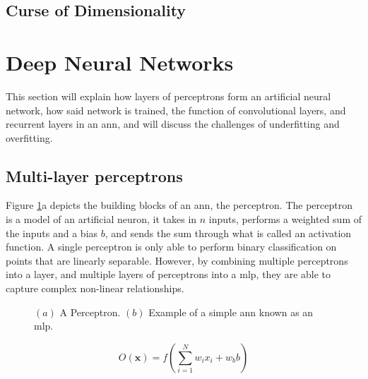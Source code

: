 \subsection{Curse of Dimensionality}

\clearpage

\section{Deep Neural Networks} \label{sec:ann}

This section will explain how layers of perceptrons form an artificial neural network, how said network is trained, the function of convolutional layers, and recurrent layers in an \acrshort{ann}, and will discuss the challenges of underfitting and overfitting.

\subsection{Multi-layer perceptrons} \label{sec:mlp}
Figure \ref{fig:perc_nn}a depicts the building blocks of an \acrshort{ann}, the perceptron. 
The perceptron is a model of an artificial neuron, it takes in $n$ inputs, performs a weighted sum of the inputs and a bias $b$, and sends the sum through what is called an activation function. A single perceptron is only able to perform binary classification on points that are linearly separable. However, by combining multiple perceptrons into a layer, and multiple layers of perceptrons into a \acrfull{mlp}, they are able to capture complex non-linear relationships. 

\begin{figure}[H]
\begin{center}
    
\end{center}
\caption{$(a)$ A Perceptron. $(b)$ Example of a simple \acrshort{ann} known as an \acrshort{mlp}.} 
\label{fig:perc_nn}
\end{figure}

\begin{equation}
    O(\mathbf{x}) = f \left ( \sum_{i = 1}^N w_i x_i + w_b b\right )
    \label{eq:perc}
\end{equation}

